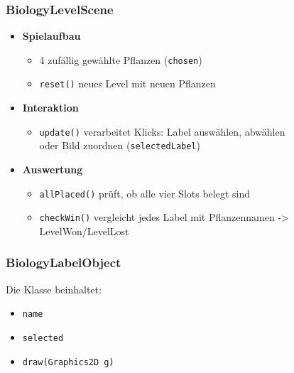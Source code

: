 \begin{frame}
	\frametitle{BiologyLevelScene}
\begin{itemize}
        \item \textbf{Spielaufbau}
        \begin{itemize} 
            \item 4 zufällig gewählte Pflanzen (\texttt{chosen})
            \item \texttt{reset()} neues Level mit neuen Pflanzen
        \end{itemize}
         \pause
        \item \textbf{Interaktion} 
        \begin{itemize} 
            \item \texttt{update()} verarbeitet Klicks: Label auswählen, abwählen\\
                  oder Bild zuordnen (\texttt{selectedLabel})
        \end{itemize}
         \pause

        \item \textbf{Auswertung} 
        \begin{itemize}
            \item \texttt{allPlaced()} prüft, ob alle vier Slots belegt sind
            \item \texttt{checkWin()} vergleicht jedes Label mit  Pflanzennamen -> LevelWon/LevelLost
        \end{itemize}
    \end{itemize}
\end{frame}

\begin{frame}
	\frametitle{BiologyLabelObject}

Die Klasse beinhaltet:
	\begin{itemize}
		\item \texttt{name}
		\item \texttt{selected}
		\item \texttt{draw(Graphics2D g)}
	\end{itemize}
\end{frame}


